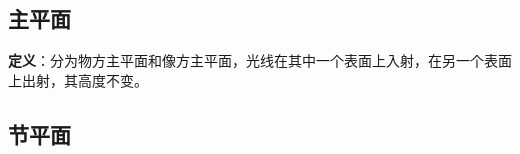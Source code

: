 
\begin{issues}
\issueDraft
\end{issues}


\subsection{主平面}

\textbf{定义}：分为物方主平面和像方主平面，光线在其中一个表面上入射，在另一个表面上出射，其高度不变。

\subsection{节平面}